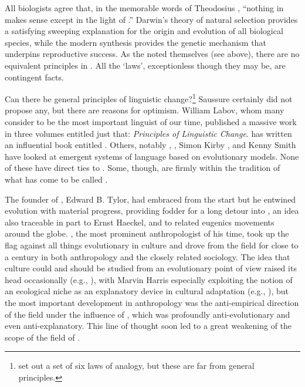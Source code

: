 \documentclass[output=paper,
modfonts
]{LSP/langsci}
\begin{document}
All biologists agree that, in the memorable words of Theodosius \citet{dobzhansky2013}, ``nothing in  makes sense except in the light of .''  Darwin's theory of natural selection provides a satisfying sweeping explanation for the origin and evolution of all biological species, while the modern synthesis provides the genetic mechanism that underpins reproductive success. As the  noted themselves (see above), there are no equivalent principles in .  All the ‘laws', exceptionless though they may be, are contingent facts.

Can there be general principles of linguistic change?\footnote{\citet{Kurylowicz1935} set out a set of six laws of analogy, but these are far from general principles.} Saussure certainly did not propose any, but there are reasons for optimism.  William Labov, whom many consider to be the most important linguist of our time, published a massive work in three volumes \citep{Labov1994,Labov2001,Labov2010} entitled just that: \textit{Principles of Linguistic Change}. \citet{blevins2004} has written an influential book entitled . Others, notably \citet{deboer2001}, \citet{galantucci2005}, Simon Kirby \citep{verhoefetal2014}, and Kenny Smith \citep{kirbyetal2015} have looked at emergent systems of language based on evolutionary models. None of these have direct ties to . Some, though, are firmly within the tradition of what has come to be called .

The founder of , Edward B. Tylor, had embraced  from the start \citep{Tylor1871} but he entwined evolution with material progress, providing fodder for a long detour into , an idea also traceable in part to Ernst Haeckel, and to related eugenics movements around the globe. , the most prominent anthropologist of his time, took up the flag against all things evolutionary in culture \citep{boas1928} and drove  from the field for close to a century in both anthropology and the closely related sociology. The idea that culture could and should be studied from an evolutionary point of view raised its head occasionally (e.g., \citealp{Sahlins1960}), with Marvin Harris especially exploiting the notion of an ecological niche as an explanatory device in cultural adaptation (e.g., \citealp{Harris1979}), but the most important development in anthropology was the anti-empirical direction of the field under the influence of \citet{Geertz1973}, which was profoundly anti-evolutionary and even anti-explanatory. This line of thought soon led to a great weakening of the scope of the field of .
\end{document}
